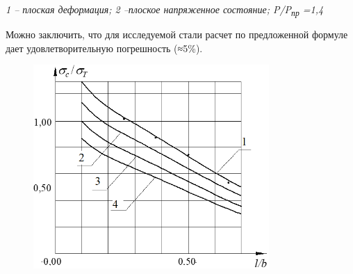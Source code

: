 \emph{1 -- плоская деформация; 2 --плоское напряженное состояние;
P/P\textsubscript{пр} =1,4}

Можно заключить, что для исследуемой стали расчет по предложенной
формуле дает удовлетворительную погрешность (≈5\%).

\begin{figure}[H]
	\centering
	\includegraphics[width=0.8\textwidth]{assets/1192}
	\caption*{}
\end{figure}

